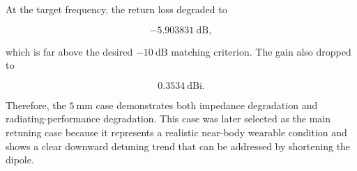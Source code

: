 At the target frequency, the return loss degraded to

\[
-5.903831~\mathrm{dB},
\]

which is far above the desired \(-10~\mathrm{dB}\) matching criterion. The gain also dropped to

\[
0.3534~\mathrm{dBi}.
\]

Therefore, the \(5~\mathrm{mm}\) case demonstrates both impedance degradation and radiating-performance degradation. This case was later selected as the main retuning case because it represents a realistic near-body wearable condition and shows a clear downward detuning trend that can be addressed by shortening the dipole.
